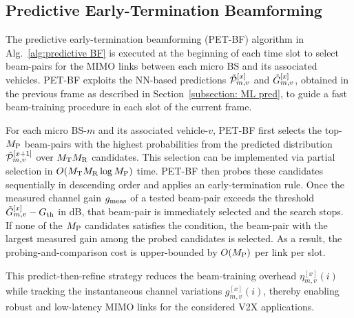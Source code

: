 \documentclass[conference, a4paper]{IEEEtran}
\theoremstyle{remark}
\begin{document}
\subsection{Predictive Early-Termination Beamforming}
\label{subsection:PET-BF}

The predictive early-termination beamforming (PET-BF) algorithm in Alg.~\ref{alg:predictive BF} is executed at the beginning of each time slot to select beam-pairs for the MIMO links between each micro BS and its associated vehicles. PET-BF exploits the NN-based predictions $\Tilde{\mathcal{P}}_{m,v}^{[x]}$ and $\Tilde{G}_{m,v}^{[x]}$, obtained in the previous frame as described in Section~\ref{subsection: ML pred}, to guide a fast beam-training procedure in each slot of the current frame.

For each micro BS-$m$ and its associated vehicle-$v$, PET-BF first selects the top-$M_{\rm P}$ beam-pairs with the highest probabilities from the predicted distribution $\Tilde{\mathcal{P}}_{m,v}^{[x+1]}$ over $M_{\rm T}M_{\rm R}$ candidates. This selection can be implemented via partial selection in $O(M_{\rm T}M_{\rm R}\log M_{\rm P})$ time. PET-BF then probes these candidates sequentially in descending order and applies an early-termination rule. Once the measured channel gain $g_{\rm meas}$ of a tested beam-pair exceeds the threshold $\Tilde{G}_{m,v}^{[x]}-G_{\rm th}$ in dB, that beam-pair is immediately selected and the search stops. If none of the $M_{\rm P}$ candidates satisfies the condition, the beam-pair with the largest measured gain among the probed candidates is selected. As a result, the probing-and-comparison cost is upper-bounded by $O(M_{\rm P})$ per link per slot.

This predict-then-refine strategy reduces the beam-training overhead $\eta_{m,v}^{[x]}(i)$ while tracking the instantaneous channel variations $g_{m,v}^{[x]}(i)$, thereby enabling robust and low-latency MIMO links for the considered V2X applications. 
\end{document}
